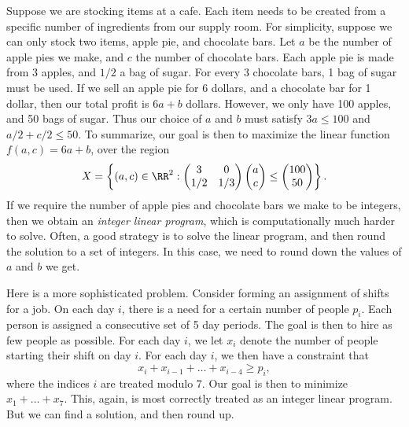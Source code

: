 \begin{example}
    Suppose we are stocking items at a cafe. Each item needs to be created from a specific number of ingredients from our supply room. For simplicity, suppose we can only stock two items, apple pie, and chocolate bars. Let $a$ be the number of apple pies we make, and $c$ the number of chocolate bars. Each apple pie is made from 3 apples, and $1/2$ a bag of sugar. For every 3 chocolate bars, 1 bag of sugar must be used. If we sell an apple pie for 6 dollars, and a chocolate bar for 1 dollar, then our total profit is $6a + b$ dollars. However, we only have 100 apples, and 50 bags of sugar. Thus our choice of $a$ and $b$ must satisfy $3a \leq 100$ and $a/2 + c/2 \leq 50$. To summarize, our goal is then to maximize the linear function $f(a,c) = 6a + b$, over the region
    \[ X = \left\{ (a,c) \in \RR^2: \begin{pmatrix} 3 & 0 \\ 1/2 & 1/3 \end{pmatrix} \begin{pmatrix} a \\ c \end{pmatrix} \leq \begin{pmatrix} 100 \\ 50 \end{pmatrix} \right\}. \]
    If we require the number of apple pies and chocolate bars we make to be integers, then we obtain an \emph{integer linear program}, which is computationally much harder to solve. Often, a good strategy is to solve the linear program, and then round the solution to a set of integers. In this case, we need to round down the values of $a$ and $b$ we get.
\end{example}

\begin{example}
    Here is a more sophisticated problem. Consider forming an assignment of shifts for a job. On each day $i$, there is a need for a certain number of people $p_i$. Each person is assigned a consecutive set of 5 day periods. The goal is then to hire as few people as possible. For each day $i$, we let $x_i$ denote the number of people starting their shift on day $i$. For each day $i$, we then have a constraint that
    \[ x_i + x_{i-1} + \dots + x_{i-4} \geq p_i, \]
    where the indices $i$ are treated modulo 7. Our goal is then to minimize $x_1 + \dots + x_7$. This, again, is most correctly treated as an integer linear program. But we can find a solution, and then round up.
\end{example}

